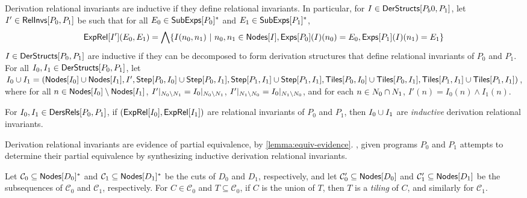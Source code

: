 %
Derivation relational invariants are inductive if they define
relational invariants.
%
In particular, for $I \in \mathsf{DerStructs}[ P_b0, P_1 ]$, let $I' \in
\mathsf{RelInvs}[ P_0, P_1 ]$ be such that for all $E_0 \in \mathsf{SubExps}[ P_0 ]^{*}$
and $E_1 \in \mathsf{SubExps}[ P_1 ]^{*}$,
\begin{align*}
  \exprel{I'}(E_0, E_1) = %
  \bigland \setformer{ I(n_0, n_1) }{ %
    n_0, n_1 \in \nodes{I},
    \dersexps{P_0}{I}(n_0) = E_0, \dersexps{P_1}{I}(n_1) = E_1 }
\end{align*}
%
$I \in \mathsf{DerStructs}[ P_0, P_1 ]$ are inductive if they can be decomposed
to form derivation structures that define relational invariants of
$P_0$ and $P_1$.
%
For all $I_0, I_1 \in \mathsf{DerStructs}[ P_0, P_1 ]$, let $I_0 \union I_1 =
(\nodes{I_0} \union \nodes{I_1}, I', %
\stepedges{P_0}{I_0} \union \stepedges{P_0}{I_1}, %
\stepedges{P_1}{I_1} \union \stepedges{P_1}{I_1}, %
\tilesof{P_0}{I_0} \union \tilesof{P_0}{I_1}, %
\tilesof{P_1}{I_1} \union \tilesof{P_1}{I_1})$, where %
for all $n \in \mathsf{Nodes}[ I_0 ] \setminus \mathsf{Nodes}[ I_1 ]$, 
$I'|_{N_0 \setminus N_1} = I_0|_{N_0 \setminus
  N_1}$, %
$I'|_{N_1 \setminus N_0} = I_0|_{N_1 \setminus
  N_0}$, and %
for each $n \in N_0 \cap N_1$, $I'(n) = I_0(n) \land
I_1(n)$.
%
\begin{defn}
  \label{defn:inductive-der-rels}
  For $I_0, I_1 \in \mathsf{DersRels}[ P_0, P_1 ]$, if $(\mathsf{ExpRel}[ I_0 ],
  \mathsf{ExpRel}[ I_1 ])$ are relational invariants of $P_0$ and $P_1$, then
  $I_0 \cup I_1$ are \emph{inductive} derivation relational
  invariants.
\end{defn}
%
Derivation relational invariants are evidence of partial equivalence,
by \autoref{lemma:equiv-evidence}.
%
\sys, given programs $P_0$ and $P_1$ attempts to determine their
partial equivalence by synthesizing inductive derivation relational
invariants.

%
Let $\mathcal{C}_0 \subseteq \mathsf{Nodes}[ D_0 ]^{*}$ and $\mathcal{C}_1
\subseteq \mathsf{Nodes}[ D_1 ]^{*}$ be the cuts of $D_0$ and $D_1$,
respectively, and let $\mathcal{C}_0' \subseteq \mathsf{Nodes}[ D_0 ]$ and
$\mathcal{C}_1' \subseteq \mathsf{Nodes}[ D_1 ]$ be the subsequences of
$\mathcal{C}_0$ and $\mathcal{C}_1$, respectively.
%
For $C \in \mathcal{C}_0$ and $T \subseteq \mathcal{C}_0$, if $C$ is
the union of $T$, then $T$ is a \emph{tiling} of $C$, and similarly
for $\mathcal{C}_1$.

